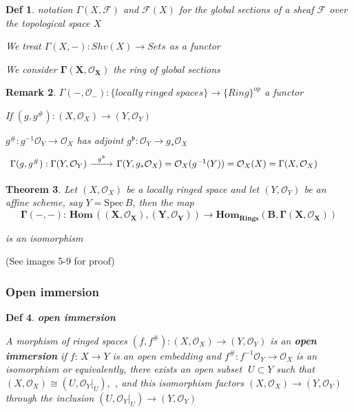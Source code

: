 \documentclass{article}
\newtheorem{theorem}{Theorem}[section]
\newtheorem{definition}[theorem]{Def}
\newtheorem{remark}[theorem]{Remark}
\begin{document}
\begin{definition}
    notation $\Gamma(X,\mathcal F)$ and $\mathcal F(X)$ for the global sections of a sheaf $\mathcal F$ over the topological space $X$

    We treat $\Gamma(X,-):Shv(X)\to Sets$ as a functor

    We consider $\bm{\Gamma(X,\mathcal O_X)}$ the ring of global sections
\end{definition}
\begin{remark}
   $\Gamma(-,\mathcal O_-):\{locally\;ringed\;spaces\}
    \to
    \{Ring\}^{op}$ a functor

    If $(g,g^{\#}):(X,\mathcal O_X)\to(Y,\mathcal O_Y)$

    $g^{\#}:g^{-1}\mathcal O_Y\to\mathcal O_X$ has adjoint $g^{\mathfrak b}:\mathcal O_Y\to g_{\ast}\mathcal O_X$
\[\begin{tikzcd}
	{\Gamma(g,g^{\#}):\Gamma(Y,\mathcal O_Y)} & {\Gamma(Y,g_{\ast}\mathcal O_X)=\mathcal O_X(g^{-1}(Y))=\mathcal O_X(X)=\Gamma(X,\mathcal O_X)} & {}
	\arrow["{g^{\mathfrak b}}", from=1-1, to=1-2]
\end{tikzcd}\]
\end{remark}
\begin{theorem}
    Let $(X,{\mathcal{O}}_{X})$ be a locally ringed space and let $(Y,{\mathcal{O}}_{Y})$ be an affine scheme, say ${Y}= \mathrm{ Spec}\, B$, then the map
$$
\bm{\Gamma(-,-):\,
Hom\,((X,{\mathcal{O}}_{X}),(Y,{\mathcal{O}}_{Y}))\longrightarrow 
Hom_{Rings}(B,\Gamma(X,{\mathcal{O}}_{X}))}
$$

is an  isomorphism
\end{theorem}

(See images 5-9 for proof)

\newpage


\subsubsection{Open immersion}
\begin{definition}
\textbf{open immersion}

    A morphism of ringed spaces $(f,f^{\#}):(X,{\mathcal O}_{X})\to(Y,{\mathcal O}_{Y})$ is an \textbf{open immersion} if $f:\,X\to Y$ is an open embedding and $f^{\#}:f^{-1}\mathcal{O}_{Y} \rightarrow\mathcal{O}_{X}$ is an isomorphism or equivalently, there exists an open subset $\;U\subset Y$ such that $(X,{\mathcal O}_{X})\cong({U},{\mathcal O}_{Y}|_{U}),$ , and this isomorphism factors $(X,{\mathcal{O}}_{X})\to(Y,{\mathcal{O}}_{Y})$ through the inclusion $(U,{\mathcal{O}}_{Y}|_{U})\to(Y,{\mathcal{O}}_{Y})$ 
\end{definition}
\end{document}
